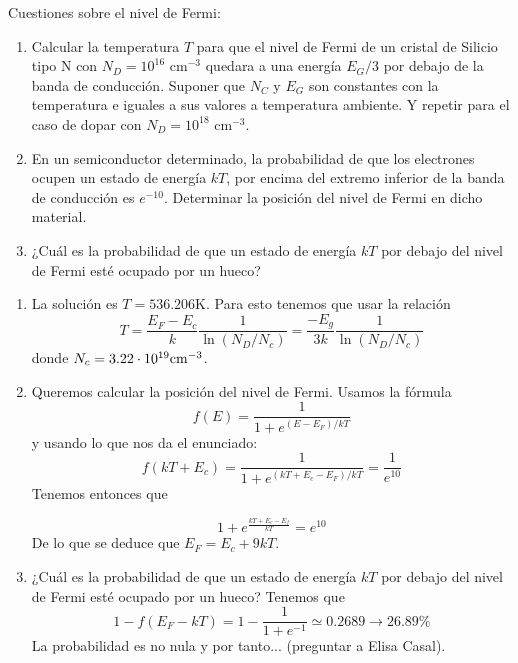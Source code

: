 \begin{texercise}
	Cuestiones sobre el nivel de Fermi:

	\begin{enumerate}[label=\alph*)]
		\item Calcular la temperatura \( T \) para que el nivel de Fermi de un cristal de Silicio tipo N con \( N_D = 10^{16} \) cm\(^{-3}\) quedara a una energía \( E_G/3 \) por debajo de la banda de conducción. Suponer que \( N_C \) y \( E_G \) son constantes con la temperatura e iguales a sus valores a temperatura ambiente. Y repetir para el caso de dopar con \( N_D = 10^{18} \) cm\(^{-3}\).

		\item En un semiconductor determinado, la probabilidad de que los electrones ocupen un estado de energía \( kT \), por encima del extremo inferior de la banda de conducción es \( e^{-10} \). Determinar la posición del nivel de Fermi en dicho material.

		\item ¿Cuál es la probabilidad de que un estado de energía \( kT \) por debajo del nivel de Fermi esté ocupado por un hueco?
	\end{enumerate}

	\tcblower
	
	\begin{enumerate}[label=\alph*)]
		\item La solución es $T=536.206$K. Para esto tenemos que usar la relación 
		\begin{equation}
			T = \frac{E_F-E_c}{k} \frac{1}{\ln (N_D/N_c)} =  \frac{-E_g}{3k} \frac{1}{\ln (N_D/N_c)}
		\end{equation}
		donde $N_c=3.22\cdot 10^{19}\text{cm}^{-3}$. 
		\item Queremos calcular la posición del nivel de Fermi. Usamos la fórmula 
		\begin{equation}
			f(E) = \frac{1}{1+e^{(E-E_F)/kT}} 
		\end{equation}
		y usando lo que nos da el enunciado:
		\begin{equation}
			f(kT+E_c) = \frac{1}{1+e^{(kT+E_c-E_F)/kT}} 
			= \frac{1}{e^{10}}
		\end{equation}
		Tenemos entonces que 

		\begin{equation}
			1+e^{\frac{kT+E_c-E_f}{kT}} = e^{10}
		\end{equation}
		De lo que se deduce que $E_F = E_c + 9kT$. 
		\item ¿Cuál es la probabilidad de que un estado de energía \( kT \) por debajo del nivel de Fermi esté ocupado por un hueco? Tenemos que 
		\begin{equation}
			1-f(E_F-kT) = 1 - \frac{1}{1+e^{-1}} \simeq 0.2689 \rightarrow 26.89 \%
		\end{equation}
		La probabilidad es no nula y por tanto... (preguntar a Elisa Casal).
	\end{enumerate}
\end{texercise}


